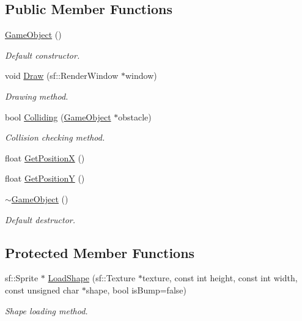 \subsection*{Public Member Functions}
\begin{DoxyCompactItemize}
\item 
\mbox{\hyperlink{class_game_object_a0348e3ee2e83d56eafca7a3547f432c4}{Game\+Object}} ()
\begin{DoxyCompactList}\small\item\em Default constructor. \end{DoxyCompactList}\item 
void \mbox{\hyperlink{class_game_object_a7ba982dd7315ab822c18dd9892112316}{Draw}} (sf\+::\+Render\+Window $\ast$window)
\begin{DoxyCompactList}\small\item\em Drawing method. \end{DoxyCompactList}\item 
bool \mbox{\hyperlink{class_game_object_a9f63ba7fa09d165f175858276f71d44b}{Colliding}} (\mbox{\hyperlink{class_game_object}{Game\+Object}} $\ast$obstacle)
\begin{DoxyCompactList}\small\item\em Collision checking method. \end{DoxyCompactList}\item 
float \mbox{\hyperlink{class_game_object_a274bf74e1658d845a0603be2972a63c4}{Get\+PositionX}} ()
\item 
float \mbox{\hyperlink{class_game_object_abe7e418773edb98562033fcfdf191dd9}{Get\+PositionY}} ()
\item 
\mbox{\label{class_game_object_ab82dfdb656f9051c0587e6593b2dda97}} 
\mbox{\hyperlink{class_game_object_ab82dfdb656f9051c0587e6593b2dda97}{$\sim$\+Game\+Object}} ()
\begin{DoxyCompactList}\small\item\em Default destructor. \end{DoxyCompactList}\end{DoxyCompactItemize}
\subsection*{Protected Member Functions}
\begin{DoxyCompactItemize}
\item 
sf\+::\+Sprite $\ast$ \mbox{\hyperlink{class_game_object_ab570c73233f2e8eb9fb3c043b1a68c4c}{Load\+Shape}} (sf\+::\+Texture $\ast$texture, const int height, const int width, const unsigned char $\ast$shape, bool is\+Bump=false)
\begin{DoxyCompactList}\small\item\em Shape loading method. \end{DoxyCompactList}\end{DoxyCompactItemize}
